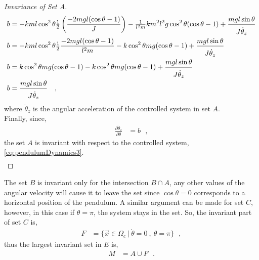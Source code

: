 \begin{proof}[Invariance of Set A]
\begin{align}
    b &= - k m l \cos^2 \theta \tfrac{1}{2} \left(\frac{-2 m g l (\cos \theta -1)}{J}\right)  - \tfrac{1}{l^2 m} k m^2 l^2 g \cos^2 \theta (\cos \theta -1)  +  \frac{m g l \sin \theta}{ J \rule{0pt}{12pt}\dot{\theta}_z} \\
    b &= - k m l \cos^2 \theta \tfrac{1}{2} \frac{-2 m g l (\cos \theta -1)}{l^2 m} - k \cos^2 \theta m g (\cos \theta -1)  +  \frac{m g l \sin \theta}{ J \rule{0pt}{12pt}\dot{\theta}_z}  \\
    b &= k \cos^2 \theta m g (\cos \theta -1) - k \cos^2 \theta m g (\cos \theta -1)  +  \frac{m g l \sin \theta}{ J \rule{0pt}{12pt}\dot{\theta}_z} \\
    b &= \frac{m g l \sin \theta}{ J \rule{0pt}{12pt}\dot{\theta}_z} \ \ \ ,  \label{eq:systemTrajSlopeInSetA}
  \end{align}
  where $\ddot{\theta}_z$ is the angular acceleration of the controlled system in set $A$.\\
  Finally, since,
  \begin{align}
    \frac{\partial \dot{\theta}_z}{\partial \theta} &= b \ \ \ ,  \label{eq:slopesEqual}
  \end{align}
  the set $A$ is invariant with respect to the controlled system, \autoref{eq:pendulumDynamics3}.\vspace{-4pt}
  \begin{align}
    \tag*{$\blacksquare\ $}
  \end{align}
\end{proof}
%
\vspace{-8pt}
The set $B$ is invariant only for the intersection $B \cap A$, any other values of the angular velocity will cause it to leave the set since $\cos \theta = 0$ corresponds to a horizontal position of the pendulum. A similar argument can be made for set $C$, however, in this case if $\theta = \pi$, the system stays in the set. So, the invariant part of set $C$ is,
\begin{align}
  F &=  \{ \vec{x} \in \Omega_c \ | \ \dot{\theta} = 0 \ , \ \theta = \pi \}  \ \ \ ,  \label{eq:F}
\end{align}
thus the largest invariant set in $E$ is,
\begin{align}
M &= A \cup F \ \ \ .  \label{eq:M}
\end{align}
